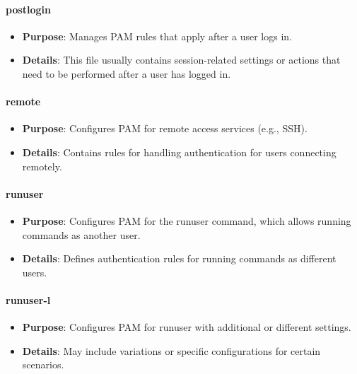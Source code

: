 \documentclass{article}
\begin{document}
\paragraph{postlogin}

\begin{itemize}
    \item \textbf{Purpose}: Manages PAM rules that apply after a user logs in.
    \item \textbf{Details}: This file usually contains session-related settings or actions that need to be performed after a user has logged in.
\end{itemize}

\paragraph{remote}

\begin{itemize}
    \item \textbf{Purpose}: Configures PAM for remote access services (e.g., SSH).
    \item \textbf{Details}: Contains rules for handling authentication for users connecting remotely.
\end{itemize}

\paragraph{runuser}

\begin{itemize}
    \item \textbf{Purpose}: Configures PAM for the runuser command, which allows running commands as another user.
    \item \textbf{Details}: Defines authentication rules for running commands as different users.
\end{itemize}

\paragraph{runuser-l}

\begin{itemize}
    \item \textbf{Purpose}: Configures PAM for runuser with additional or different settings.
    \item \textbf{Details}: May include variations or specific configurations for certain scenarios.
\end{itemize}
\end{document}

